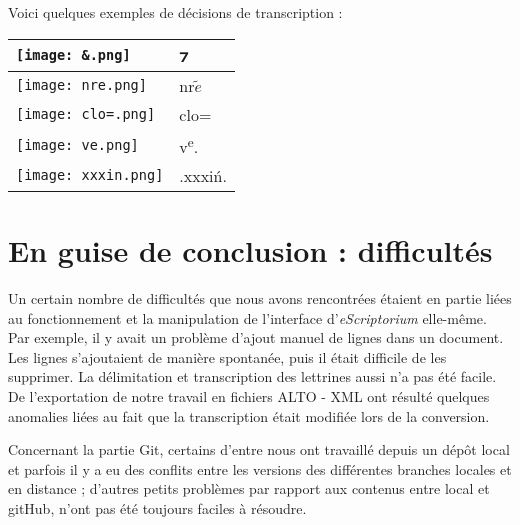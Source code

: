 \documentclass{article}
\newcommand{\vizL}{{\setmainfont{Linux Libertine O}\symbol{"204A}}}
\begin{document}
Voici quelques exemples de décisions de transcription :


 \begin{center}
\begin{tabular}{ |m{2.5cm}|m{1cm}| }

 \hline
 \texttt{[image: \&.png]} & \vizL ⁊ \\
 \hline
 \texttt{[image: nre.png]} &nr$\tilde{e}$\\
 \hline
 \texttt{[image: clo=.png]} & clo= \\ 
  \hline
 \texttt{[image: ve.png]} & v\textsuperscript{e}. \\ 
  \hline
 \texttt{[image: xxxin.png]} & .xxxiń. \\ 
 \hline
 
\end{tabular}

\end{center}




\section{En guise de conclusion : difficultés}
Un certain nombre de difficultés que nous avons rencontrées étaient en partie liées au fonctionnement et la manipulation de l'interface d'\emph{eScriptorium} elle-même. Par exemple, il y avait un problème d'ajout manuel de lignes dans un document. Les lignes s'ajoutaient de manière spontanée, puis il était difficile de les supprimer. La délimitation et transcription des lettrines aussi n'a pas été facile. De l'exportation de notre travail en fichiers ALTO - XML ont résulté quelques anomalies liées au fait que la transcription était modifiée lors de la conversion.

Concernant la partie Git, certains d'entre nous ont travaillé depuis un dépôt local et parfois il y a eu des conflits entre les versions des différentes branches locales et en distance ; d'autres petits problèmes par rapport aux contenus entre local et gitHub, n'ont pas été toujours faciles  à résoudre. 

\nocite{pinche_guide_2022}
\nocite{mandach_geste_2014}
\nocite{lokkos_catalogue_1978}
\nocite{vielliard_conseils_2014}
\nocite{lambert_notice_2017}
\nocite{stutzmann_paleographie_2011}
\nocite{brun_2020}
\nocite{gautier_compte-rendu_nodate}

\newpage
\printbibliography[title=Bibliographie]
\end{document}
